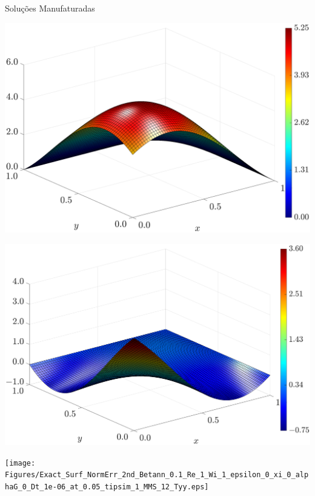 \begin{frame}{Soluções Manufaturadas}
    \centering
    \captionsetup{justification=centering}
    \label{fig:sol_manufaturadas_3}
    \begin{minipage}{0.31\textwidth}
        \centering
        \includegraphics[width=\textwidth]{Figures/Exact_Surf_NormErr_2nd_Betann_0.1_Re_1_Wi_1_epsilon_0_xi_0_alphaG_0_Dt_1e-06_at_0.05_tipsim_1_MMS_12_Txx.eps}
        \label{fig_solexaTxxCase1}
    \end{minipage}
    \hfill
    \begin{minipage}{0.31\textwidth}
        \centering
        \includegraphics[width=\textwidth]{Figures/Exact_Surf_NormErr_2nd_Betann_0.1_Re_1_Wi_1_epsilon_0_xi_0_alphaG_0_Dt_1e-06_at_0.05_tipsim_1_MMS_12_Txy.eps}
        \label{fig_solexaTxyCase1}
    \end{minipage}
    \hfill
    \begin{minipage}{0.31\textwidth}
        \centering
        \texttt{[image: Figures/Exact\_Surf\_NormErr\_2nd\_Betann\_0.1\_Re\_1\_Wi\_1\_epsilon\_0\_xi\_0\_alphaG\_0\_Dt\_1e-06\_at\_0.05\_tipsim\_1\_MMS\_12\_Tyy.eps]}
        \label{fig_solexaTyyCase1}
    \end{minipage}
\end{frame}


